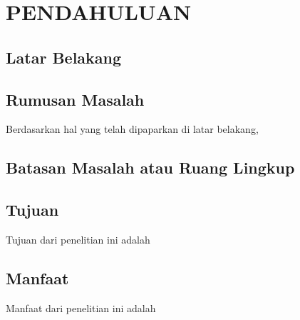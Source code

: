\chapter{PENDAHULUAN}

\section{Latar Belakang}


\lipsum[3]

\section{Rumusan Masalah}

Berdasarkan hal yang telah dipaparkan di latar belakang, \lipsum[4]

\section{Batasan Masalah atau Ruang Lingkup}

\lipsum[6]

\section{Tujuan}

Tujuan dari penelitian ini adalah \lipsum[7][1-14]

\section{Manfaat}

Manfaat dari penelitian ini adalah \lipsum[8][1-14]
